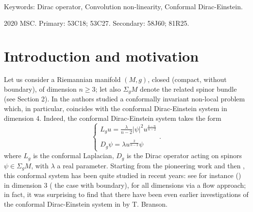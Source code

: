 \documentclass[11pt]{article}
\begin{document}
\noindent
{\small Keywords: Dirac operator, Convolution non-linearity, Conformal Dirac-Einstein.

\vspace{4mm}

\noindent
{\small 2020 MSC. Primary: 53C18; 53C27.  Secondary: 58J60; 81R25.}

\vspace{4mm}




\section{Introduction and motivation}
Let us consider a Riemannian manifold $(M,g)$, closed (compact, without boundary), of dimension $n \geq 3$; let also $\Sigma_{g} M$ denote the related spinor bundle (see Section 2). In \cite{MMM} the authors studied a conformally invariant non-local problem which, in particular, coincides with the conformal Dirac-Einstein system in dimension 4. Indeed, the conformal Dirac-Einstein system takes the form  
\begin{equation}\label{DE4}
\left\{\begin{array}{ll}
L_{g} u=\displaystyle\frac{\lambda}{n-2}|\psi|^{2} u^{\frac{4-n}{n-2}}\\
\\
D_{g}\psi=\lambda u^{\frac{2}{n-2}} \psi
\end{array}.
\right.
\end{equation}
where $L_{g}$ is the conformal Laplacian, $D_{g}$ is the Dirac operator acting on spinors $\psi\in \Sigma_{g} M$, with $\lambda$ a real parameter. Starting from the pioneering work \cite{BrillWheeler1957} and then \cite{Fin}, this conformal system has been quite studied in recent years: see for instance (\cite{BM, MaalaouiMartino2019, MMX}) in dimension 3 (\cite{BorrelliMaalaouiMartino2023} the case with boundary), \cite{YX} for all dimensions via a flow approach; in fact, it was surprising to find that there have been even earlier investigations of the conformal Dirac-Einstein system in \cite{Br} by T. Branson.


}
\end{document}
